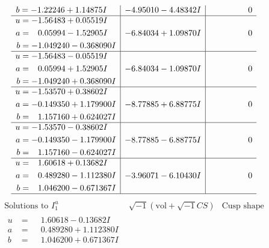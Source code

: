 \documentclass[1p]{elsarticle_modified}
\theoremstyle{definition}
\newcommand{\I}{\sqrt{-1}}
\begin{document}
$$\begin{array}{c|c|c}
\begin{aligned}
b &= -1.22246 + 1.14875 I\end{aligned}
 & -4.95010 - 4.48342 I & \phantom{-0.000000 } 0 \\ \hline\begin{aligned}
u &= -1.56483 + 0.05519 I \\
a &= \phantom{-}0.05994 - 1.52905 I \\
b &= -1.049240 - 0.368090 I\end{aligned}
 & -6.84034 + 1.09870 I & \phantom{-0.000000 } 0 \\ \hline\begin{aligned}
u &= -1.56483 - 0.05519 I \\
a &= \phantom{-}0.05994 + 1.52905 I \\
b &= -1.049240 + 0.368090 I\end{aligned}
 & -6.84034 - 1.09870 I & \phantom{-0.000000 } 0 \\ \hline\begin{aligned}
u &= -1.53570 + 0.38602 I \\
a &= -0.149350 + 1.179900 I \\
b &= \phantom{-}1.157160 + 0.624027 I\end{aligned}
 & -8.77885 + 6.88775 I & \phantom{-0.000000 } 0 \\ \hline\begin{aligned}
u &= -1.53570 - 0.38602 I \\
a &= -0.149350 - 1.179900 I \\
b &= \phantom{-}1.157160 - 0.624027 I\end{aligned}
 & -8.77885 - 6.88775 I & \phantom{-0.000000 } 0 \\ \hline\begin{aligned}
u &= \phantom{-}1.60618 + 0.13682 I \\
a &= \phantom{-}0.489280 - 1.112380 I \\
b &= \phantom{-}1.046200 - 0.671367 I\end{aligned}
 & -3.96071 - 6.10430 I & \phantom{-0.000000 } 0\\
 \hline 
 \end{array}$$\newpage$$\begin{array}{c|c|c}  
\text{Solutions to }I^u_{1}& \I (\text{vol} + \sqrt{-1}CS) & \text{Cusp shape}\\
 \hline 
\begin{aligned}
u &= \phantom{-}1.60618 - 0.13682 I \\
a &= \phantom{-}0.489280 + 1.112380 I \\
b &= \phantom{-}1.046200 + 0.671367 I\end{aligned}

\end{array}$$
\end{document}
